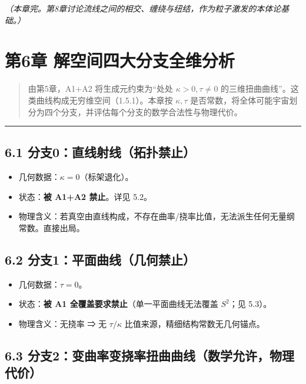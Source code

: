 \emph{（本章完。第8章讨论流线之间的相交、缠绕与纽结，作为粒子激发的本体论基础。）}

\section{第6章
解空间四大分支全维分析}\label{ux7b2c6ux7ae0-ux89e3ux7a7aux95f4ux56dbux5927ux5206ux652fux5168ux7ef4ux5206ux6790-1}

\begin{quote}
由第5章，A1+A2 将生成元约束为``处处 \(\kappa>0,\tau\neq0\)
的三维扭曲曲线''。这类曲线构成无穷维空间（1.5.1）。本章按
\(\kappa,\tau\)
是否常数，将全体可能宇宙划分为四个分支，并评估每个分支的数学合法性与物理代价。
\end{quote}

\begin{center}\rule{0.5\linewidth}{0.5pt}\end{center}

\subsection{6.1
分支0：直线射线（拓扑禁止）}\label{ux5206ux652f0ux76f4ux7ebfux5c04ux7ebfux62d3ux6251ux7981ux6b62}

\begin{itemize}
\tightlist
\item
  几何数据：\(\kappa=0\)（标架退化）。
\item
  状态：\textbf{被 A1+A2 禁止}。详见 5.2。
\item
  物理含义：若真空由直线构成，不存在曲率/挠率比值，无法派生任何无量纲常数。直接出局。
\end{itemize}

\subsection{6.2
分支1：平面曲线（几何禁止）}\label{ux5206ux652f1ux5e73ux9762ux66f2ux7ebfux51e0ux4f55ux7981ux6b62}

\begin{itemize}
\tightlist
\item
  几何数据：\(\tau=0\)。
\item
  状态：\textbf{被 A1 全覆盖要求禁止}（单一平面曲线无法覆盖 \(S^2\)；见
  5.3）。
\item
  物理含义：无挠率 ⇒ 无 \(\tau/\kappa\)
  比值来源，精细结构常数无几何锚点。
\end{itemize}

\subsection{6.3
分支2：变曲率变挠率扭曲曲线（数学允许，物理代价）}\label{ux5206ux652f2ux53d8ux66f2ux7387ux53d8ux6320ux7387ux626dux66f2ux66f2ux7ebfux6570ux5b66ux5141ux8bb8ux7269ux7406ux4ee3ux4ef7}

